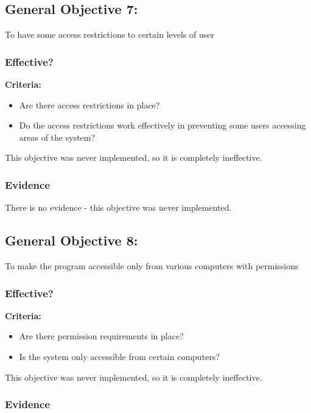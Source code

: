 \subsection{General Objective 7: }

To have some access restrictions to certain levels of user

\subsubsection{Effective?}

\textbf{Criteria: }

\begin{itemize}
	\item Are there access restrictions in place?
	\item Do the access restrictions work effectively in preventing some users accessing areas of the system?
\end{itemize}

This objective was never implemented, so it is completely ineffective.

\subsubsection{Evidence}

There is no evidence - this objective was never implemented.

\subsection{General Objective 8: }

To make the program accessible only from various computers with permissions

\subsubsection{Effective?}

\textbf{Criteria: }

\begin{itemize}
	\item Are there permission requirements in place?
	\item Is the system only accessible from certain computers?
\end{itemize}

This objective was never implemented, so it is completely ineffective.

\subsubsection{Evidence}

